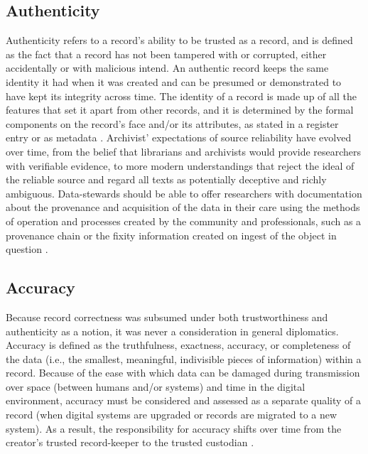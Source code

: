 \subsection{Authenticity}
Authenticity refers to a record's ability to be trusted as a record, and is defined as the fact that a record has not been tampered with or corrupted, either accidentally or with malicious intend. An authentic record keeps the same identity it had when it was created and can be presumed or demonstrated to have kept its integrity across time. The identity of a record is made up of all the features that set it apart from other records, and it is determined by the formal components on the record's face and/or its attributes, as stated in a register entry or as metadata \cite[52]{duranti2009digital}.
Archivist' expectations of source reliability have evolved over time, from the belief that librarians and archivists would provide researchers with verifiable evidence, to more modern understandings that reject the ideal of the reliable source and regard all texts as potentially deceptive and richly ambiguous. Data-stewards should be able to offer researchers with documentation about the provenance and acquisition of the data in their care using the methods of operation and processes created by the community and professionals, such as a provenance chain or the fixity information created on ingest of the object in question \cite[32]{kirschenbaum2010digital}.

\subsection{Accuracy}
Because record correctness was subsumed under both trustworthiness and authenticity as a notion, it was never a consideration in general diplomatics. Accuracy is defined as the truthfulness, exactness, accuracy, or completeness of the data (i.e., the smallest, meaningful, indivisible pieces of information) within a record. Because of the ease with which data can be damaged during transmission over space (between humans and/or systems) and time in the digital environment, accuracy must be considered and assessed as a separate quality of a record (when digital systems are upgraded or records are migrated to a new system). As a result, the responsibility for accuracy shifts over time from the creator's trusted record-keeper to the trusted custodian \cite[14]{kirschenbaum2010digital}.

